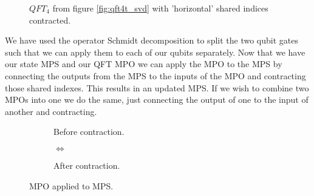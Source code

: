 \begin{figure}[H]
    \centering 
    \caption{$QFT_4$ from figure \ref{fig:qft4t_svd} with 'horizontal' shared indices contracted.}
    \label{fig:mpo}
\end{figure}
\noindent 
We have used the operator Schmidt decomposition to split the two qubit gates such that we can apply them to each of our qubits separately.  
\noindent
Now that we have our state MPS and our QFT MPO we can apply the MPO to the MPS by connecting the outputs from the MPS to the inputs of the MPO and contracting those shared indexes. This results in an updated MPS. If we wish to combine two MPOs into one we do the same, just connecting the output of one to the input of another and contracting. 

\begin{figure}[H]
    \centering 
    \begin{subfigure}{.3\textwidth}
        \centering
        \caption{Before contraction.}
    \end{subfigure}%
    \begin{subfigure}{.2\textwidth}
      \centering
        $\iff$
        \vspace{5em}
    \end{subfigure}
    \begin{subfigure}{.3\textwidth}
        \hspace{2em}
        \caption{After contraction.}
    \end{subfigure}%
    \caption{MPO applied to MPS.}
    \label{fig:mpo_mps}
\end{figure}

